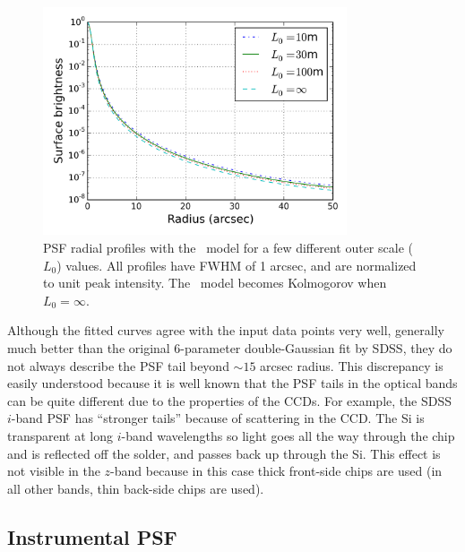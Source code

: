 \begin{figure}[ht]
\centering
\includegraphics[width=0.8\textwidth]{FIGURES/vonK.png}
\vskip -0.2in 
\caption{PSF radial profiles with the \vk~model for a few different
  outer scale ($L_0$) values. All profiles have FWHM of 1 arcsec, and
  are normalized to unit peak intensity. The \vk~model becomes
  Kolmogorov when $L_0 = \infty$.
\label{fig:vonK}}
\end{figure}




Although the fitted
curves agree with the input data points very well, generally much better than the
original 6-parameter double-Gaussian fit by SDSS, they do not always describe
the PSF tail beyond $\sim 15$ arcsec radius. This discrepancy is easily understood
because it is well known that the PSF tails in the optical bands can be quite
different due to the properties of the CCDs.
For example, the SDSS $i$-band PSF has ``stronger tails''
because of scattering in the CCD.  The Si is transparent at long $i$-band wavelengths 
so light goes all the way through the chip and is reflected off the solder, and passes 
back up through the Si. This effect is not visible in the $z$-band because in this case
thick front-side chips are used (in all other bands, thin back-side chips are used). 



\subsection{Instrumental PSF \label{sec:instrPSF}} 

